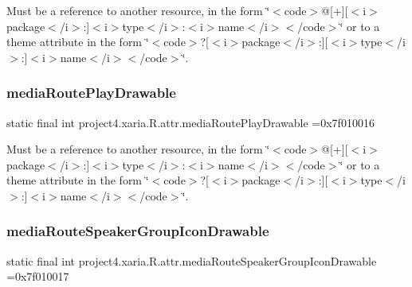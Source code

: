 Must be a reference to another resource, in the form \char`\"{}$<$code$>$@\mbox{[}+\mbox{]}\mbox{[}$<$i$>$package$<$/i$>$\+:\mbox{]}$<$i$>$type$<$/i$>$\+:$<$i$>$name$<$/i$>$$<$/code$>$\char`\"{} or to a theme attribute in the form \char`\"{}$<$code$>$?\mbox{[}$<$i$>$package$<$/i$>$\+:\mbox{]}\mbox{[}$<$i$>$type$<$/i$>$\+:\mbox{]}$<$i$>$name$<$/i$>$$<$/code$>$\char`\"{}. \mbox{\label{classproject4_1_1xaria_1_1R_1_1attr_a842679cbadf85846aa6bdad20aed5605}} 
\subsubsection{\texorpdfstring{media\+Route\+Play\+Drawable}{mediaRoutePlayDrawable}}
{\footnotesize\ttfamily static final int project4.\+xaria.\+R.\+attr.\+media\+Route\+Play\+Drawable =0x7f010016\hspace{0.3cm}{\ttfamily [static]}}

Must be a reference to another resource, in the form \char`\"{}$<$code$>$@\mbox{[}+\mbox{]}\mbox{[}$<$i$>$package$<$/i$>$\+:\mbox{]}$<$i$>$type$<$/i$>$\+:$<$i$>$name$<$/i$>$$<$/code$>$\char`\"{} or to a theme attribute in the form \char`\"{}$<$code$>$?\mbox{[}$<$i$>$package$<$/i$>$\+:\mbox{]}\mbox{[}$<$i$>$type$<$/i$>$\+:\mbox{]}$<$i$>$name$<$/i$>$$<$/code$>$\char`\"{}. \mbox{\label{classproject4_1_1xaria_1_1R_1_1attr_a68c06d8657e30e6f8089897ea56c111c}} 
\subsubsection{\texorpdfstring{media\+Route\+Speaker\+Group\+Icon\+Drawable}{mediaRouteSpeakerGroupIconDrawable}}
{\footnotesize\ttfamily static final int project4.\+xaria.\+R.\+attr.\+media\+Route\+Speaker\+Group\+Icon\+Drawable =0x7f010017\hspace{0.3cm}{\ttfamily [static]}}

